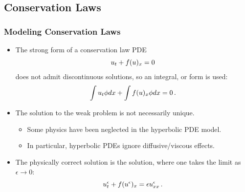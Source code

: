 \subsection{Conservation Laws}
\begin{frame}
\frametitle{Modeling Conservation Laws}

\begin{itemize}
  \item The strong form of a conservation law PDE
    \begin{equation}
      u_t + f(u)_x
      = 0
    \end{equation}
    does not admit discontinuous solutions, so an integral, or  form
    is used:
    \begin{equation}
      \int u_t\phi dx
        + \int f(u)_x\phi dx
      = 0 \,.
    \end{equation}
  \item The solution to the weak problem is not necessarily unique.
    \begin{itemize}
      \item Some physics have been neglected in the hyperbolic PDE model.
      \item In particular, hyperbolic PDEs ignore diffusive/viscous effects.
    \end{itemize}
  \item The physically correct solution is the 
    solution, where one takes the limit as $\epsilon\rightarrow0$:
    \begin{equation}
      u^\epsilon_t
        + f(u^\epsilon)_x
      = \epsilon u_{xx}^\epsilon \,.
    \end{equation}
\end{itemize}

\end{frame}
